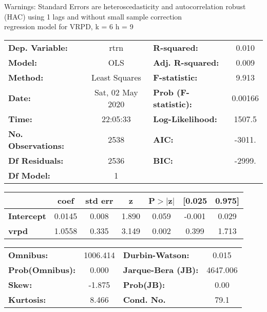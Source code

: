 Warnings: \newline
 [1] Standard Errors are heteroscedasticity and autocorrelation robust (HAC) using 1 lags and without small sample correction\\ 

regression model for VRPD, k = 6 h = 9\begin{center}
\begin{tabular}{lclc}
\toprule
\textbf{Dep. Variable:}    &       rtrn       & \textbf{  R-squared:         } &     0.010   \\
\textbf{Model:}            &       OLS        & \textbf{  Adj. R-squared:    } &     0.009   \\
\textbf{Method:}           &  Least Squares   & \textbf{  F-statistic:       } &     9.913   \\
\textbf{Date:}             & Sat, 02 May 2020 & \textbf{  Prob (F-statistic):} &  0.00166    \\
\textbf{Time:}             &     22:05:33     & \textbf{  Log-Likelihood:    } &    1507.5   \\
\textbf{No. Observations:} &        2538      & \textbf{  AIC:               } &    -3011.   \\
\textbf{Df Residuals:}     &        2536      & \textbf{  BIC:               } &    -2999.   \\
\textbf{Df Model:}         &           1      & \textbf{                     } &             \\
\bottomrule
\end{tabular}
\begin{tabular}{lcccccc}
                   & \textbf{coef} & \textbf{std err} & \textbf{z} & \textbf{P$> |$z$|$} & \textbf{[0.025} & \textbf{0.975]}  \\
\midrule
\textbf{Intercept} &       0.0145  &        0.008     &     1.890  &         0.059        &       -0.001    &        0.029     \\
\textbf{vrpd}      &       1.0558  &        0.335     &     3.149  &         0.002        &        0.399    &        1.713     \\
\bottomrule
\end{tabular}
\begin{tabular}{lclc}
\textbf{Omnibus:}       & 1006.414 & \textbf{  Durbin-Watson:     } &    0.015  \\
\textbf{Prob(Omnibus):} &   0.000  & \textbf{  Jarque-Bera (JB):  } & 4647.006  \\
\textbf{Skew:}          &  -1.875  & \textbf{  Prob(JB):          } &     0.00  \\
\textbf{Kurtosis:}      &   8.466  & \textbf{  Cond. No.          } &     79.1  \\
\bottomrule
\end{tabular}
\end{center}

